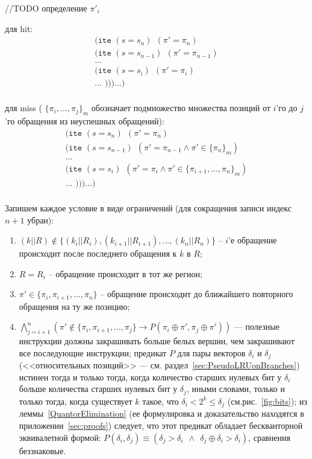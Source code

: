 //TODO определение $\pi'_i$

для hit: 
$$
\begin{array}{l}
\texttt{(ite~} (s = s_n) ~~ (\pi' = \pi_n)\\
\texttt{(ite~} (s = s_{n-1}) ~~ (\pi' = \pi_{n-1})\\
...\\
\texttt{(ite~} (s = s_i) ~~ (\pi' = \pi_i)\\
... \texttt{~)))...)}\\
\end{array}
$$

для miss ( $\{\pi_i, ..., \pi_j\}_m$ обозначает подмножество множества позиций от $i$'го до $j$'го обращения из неуспешных обращений):
$$
\begin{array}{l}
\texttt{(ite~} (s = s_n) ~~ (\pi' = \pi_n)\\
\texttt{(ite~} (s = s_{n-1}) ~~ (\pi' = \pi_{n-1} \wedge \pi' \in \{\pi_n\}_m)\\
...\\
\texttt{(ite~} (s = s_i) ~~ (\pi' = \pi_i \wedge \pi' \in \{\pi_{i+1}, ..., \pi_n\}_m)\\
... \texttt{~)))...)}\\
\end{array}
$$

Запишем каждое условие в виде ограничений (для сокращения записи индекс $n+1$ убран):
\begin{enumerate}
    \item $(k||R) \notin \{(k_i||R_i), (k_{i+1}||R_{i+1}), ..., (k_n||R_n)\}$ --
$i$'е обращение происходит после последнего обращения к $k$ в $R$;
    \item $R = R_i$ -- обращение происходит в тот же регион;
    \item $\pi' \in \{\pi_i, \pi_{i+1}, ..., \pi_n\}$ -- обращение происходит до ближайшего повторного обращения на ту же позицию;
    \item $\bigwedge\limits_{j = i+1}^n (\pi' \notin \{\pi_i, \pi_{i+1}, ..., \pi_j\} \rightarrow P(\pi_i \oplus \pi', \pi_j \oplus \pi'))$ --- полезные инструкции должны закрашивать больше белых вершин, чем закрашивают все последующие инструкции;  предикат $P$ для пары векторов $\delta_i$ и $\delta_j$ (<<относительных позиций>> --- см. раздел~\ref{sec:PseudoLRUonBranches}) истинен тогда и только тогда, когда количество старших нулевых бит у $\delta_i$ больше количества старших нулевых бит у $\delta_j$, иными словами, только и только тогда, когда существует $k$ такое, что $\delta_i < 2^k \leqslant \delta_j$ (см.рис.~\ref{fig:bits}); из леммы~\ref{QuantorElimination} (ее формулировка и доказательство находятся в приложении~\ref{sec:proofs}) следует, что этот предикат обладает бескванторной эквивалетной формой: $P(\delta_i, \delta_j) \equiv (\delta_j > \delta_i~~\wedge~~\delta_j \oplus \delta_i > \delta_i)$, сравнения беззнаковые.
\end{enumerate}

